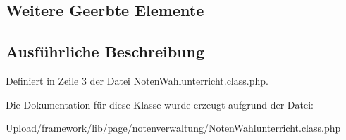 \subsection*{Weitere Geerbte Elemente}


\subsection{Ausführliche Beschreibung}


Definiert in Zeile 3 der Datei Noten\+Wahlunterricht.\+class.\+php.



Die Dokumentation für diese Klasse wurde erzeugt aufgrund der Datei\+:\begin{DoxyCompactItemize}
\item 
Upload/framework/lib/page/notenverwaltung/Noten\+Wahlunterricht.\+class.\+php\end{DoxyCompactItemize}
